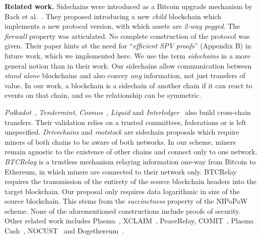 \noindent\textbf{Related work. }
Sidechains were introduced as a Bitcoin upgrade mechanism by Back et
al.~\cite{sidechains}. They proposed introducing a new \emph{child} blockchain
which implements a new protocol version, with which assets are \emph{2-way
pegged}. The \emph{firewall} property was articulated. No complete construction
of the protocol was given. Their paper hints at the need for ``\emph{efficient
SPV proofs}'' (Appendix B) in future work, which we implemented here. We use the
term \emph{sidechains} in a more general notion than in their work. Our
sidechains allow communication between \emph{stand alone} blockchains and also
convey \emph{any} information, not just transfers of value. In our work, a
blockchain is a sidechain of another chain if it can react to events on that
chain, and so the relationship can be symmetric.

\emph{Polkadot}~\cite{polkadot}, \emph{Tendermint},
\emph{Cosmos}~\cite{tendermint}, \emph{Liquid} and
\emph{Interledger}~\cite{interledger} also build cross-chain transfers. Their
validation relies on a trusted committees, federations or is left unspecified.
\emph{Drivechains} and \emph{rootstock} are sidechain proposals which require
miners of both chains to be aware of both networks. In our scheme, miners remain
agnostic to the existence of other chains and connect only to one network.
\emph{BTCRelay} is a trustless mechanism relaying information one-way from
Bitcoin to Ethereum, in which miners are connected to their network only.
BTCRelay requires the transmission of the entirety of the source blockchain
headers into the target blockchain. Our proposal only requires data logarithmic
in size of the source blockchain. This stems from the \emph{succinctness}
property of the NIPoPoW scheme.
None of the aforementioned constructions include
proofs of security.
Other related work includes Plasma~\cite{plasma},
XCLAIM~\cite{xclaim}, PeaceRelay, COMIT~\cite{comit}, Plasma Cash~\cite{plasmacash},
NOCUST~\cite{nocust} and Dogethereum~\cite{dogethereum}.
